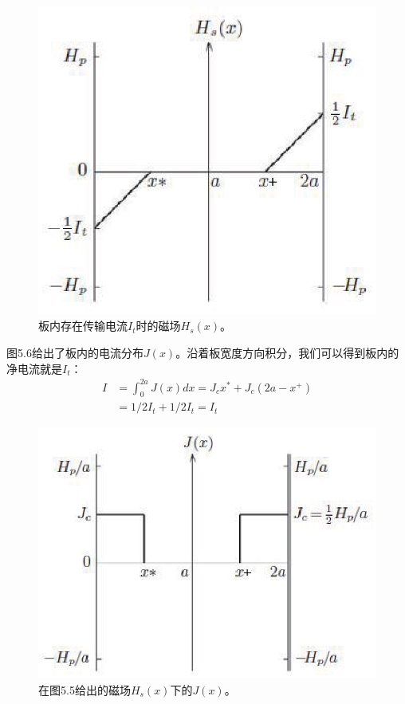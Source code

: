 \begin{figure}[htbp]
  \centering
 \includegraphics[scale=0.8]{chpt5/figs/fig5.5.eps}
  \caption{板内存在传输电流$I_t$时的磁场$H_s(x)$。}\label{fig:hwithi}
\end{figure}

图5.6给出了板内的电流分布$J(x)$。沿着板宽度方向积分，我们可以得到板内的净电流就是$I_t$：
\begin{subequations}
	\begin{align}
  I&=\int_{0}^{2a}J(x)dx=J_c x^*+J_c(2a-x^+)\\
  &=1/2 I_t +1/2 I_t=I_t
	\end{align}
\end{subequations}

\begin{figure}[htbp]
  \centering
 \includegraphics[scale=0.8]{chpt5/figs/fig5.6.eps}
  \caption{在图5.5给出的磁场$H_s(x)$下的$J(x)。$}\label{fig:jtoh5.5}
\end{figure}

